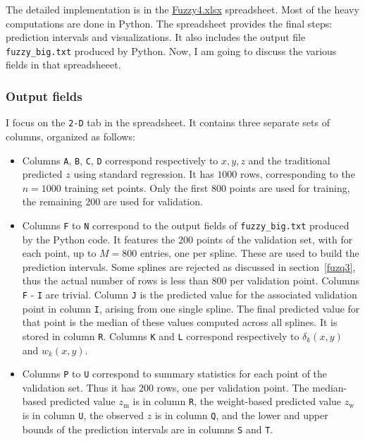 \documentclass[oneside,10pt]{book}
\begin{document}
The detailed implementation is in the \href{https://ln5.sync.com/dl/0caeb8e10/mztnibg9-xrkdks7g-r8bsgabw-3fsizwif}{Fuzzy4.xlsx} spreadsheet. Most of the heavy computations are done in Python. The spreadsheet provides the final steps: prediction intervals and visualizations. It also includes the output file \texttt{fuzzy\_big.txt} produced by Python. Now, I am going to discuss
the various fields in that spreadsheeet.

\subsubsection{Output fields}

I focus on the \texttt{2-D} tab in the spreadsheet. It contains three separate sets of columns, organized as follows:

\begin{itemize}
\item Columns \texttt{A}, \texttt{B}, \texttt{C}, \texttt{D} correspond respectively to $x, y, z$ and the traditional predicted $z$ using standard regression. It has $1000$ rows, corresponding to the $n=1000$ training set points. Only the first $800$ points are used for training, the remaining $200$ are used for validation.
\item Columns \texttt{F} to \texttt{N} correspond to the output fields of  \texttt{fuzzy\_big.txt} produced by the Python code. It features the $200$ points of the validation set, with for each point, up to $M=800$ entries, one per spline. These are used to build the prediction intervals. Some splines are rejected as discussed in section~\ref{fuzq3}, thus the actual number of rows is less than $800$ per validation point. Columns \texttt{F} - \texttt{I} are trivial. Column \texttt{J} is the predicted value for the associated validation point in column \texttt{I}, arising from one single spline. The final predicted value for that point is the median of these values computed across all splines. It is stored in column \texttt{R}. Columns \texttt{K} and \texttt{L} correspond respectively
to $\delta_k(x,y)$ and $w_k(x,y)$.
\item Columns \texttt{P} to \texttt{U} correspond to summary statistics for each point of the validation set. Thus it has $200$ rows, one per validation point. The median-based predicted
 value $z_{\text{m}}$ is in column \texttt{R}, the weight-based predicted value $z_{\text{w}}$ is in column \texttt{U}, the observed $z$ is in column \texttt{Q}, and the lower and upper bounds of the prediction intervals are in columns \texttt{S} and \texttt{T}.
\end{itemize}
\end{document}
